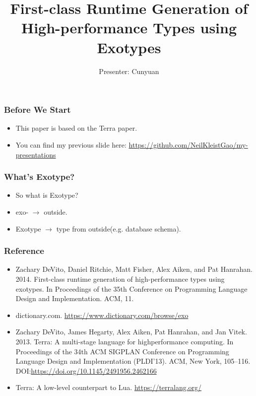 \documentclass{beamer}
\begin{document}
\title{First-class Runtime Generation of High-performance Types using Exotypes}
\author{Presenter: Cunyuan}
\maketitle

\begin{frame}
	\frametitle{Before We Start}
  \begin{itemize}
  \item This paper is based on the Terra paper.\pause
  \item You can find my previous slide here: \url{https://github.com/NeilKleistGao/my-presentations}
  \end{itemize}
\end{frame}

\begin{frame}
	\frametitle{What's Exotype?}
  \begin{itemize}
  \item So what is Exotype?\pause
  \item exo- $\rightarrow$ outside.\pause
  \item Exotype $\rightarrow$ type from outside(e.g. database schema).
  \end{itemize}
\end{frame}

\begin{frame}
	\frametitle{Reference}
  \begin{itemize}
  \item Zachary DeVito, Daniel Ritchie, Matt Fisher, Alex Aiken, and Pat Hanrahan. 2014. First-class runtime generation of high-performance types using exotypes. In Proceedings of the 35th Conference on Programming Language Design and Implementation. ACM, 11.
  \item dictionary.com. \url{https://www.dictionary.com/browse/exo}
  \item Zachary DeVito, James Hegarty, Alex Aiken, Pat Hanrahan, and Jan Vitek. 2013. Terra: A multi-stage language for highperformance computing. In Proceedings of the 34th ACM SIGPLAN Conference on Programming Language Design and Implementation (PLDI’13). ACM, New York, 105–116. DOI:\url{https://doi.org/10.1145/2491956.2462166}
  \item Terra: A low-level counterpart to Lua. \url{https://terralang.org/}
  \end{itemize}
\end{frame}
\end{document}
